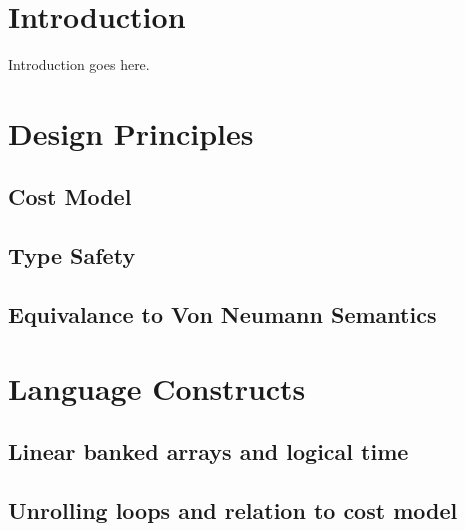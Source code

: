 \documentclass[acmsmall,review,anonymous]{acmart}\settopmatter{printfolios=true,printccs=false,printacmref=false}
\begin{document}


\maketitle

\section{Introduction}
Introduction goes here.

\section{Design Principles}
\subsection{Cost Model}
\subsection{Type Safety}
\subsection{Equivalance to Von Neumann Semantics}

\section{Language Constructs}
\subsection{Linear banked arrays and logical time}
\subsection{Unrolling loops and relation to cost model}
\end{document}
